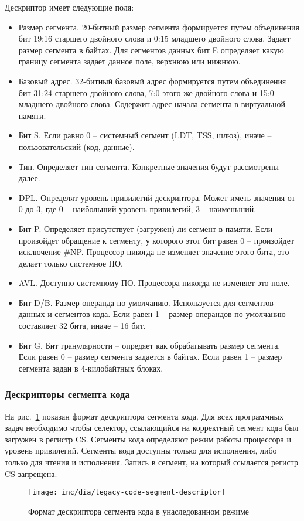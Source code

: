 Дескриптор имеет следующие поля:
\begin{itemize}
\item Размер сегмента. 20-битный размер сегмента формируется путем объединения
	бит 19:16 старшего двойного слова и 0:15 младшего двойного слова. Задает размер сегмента
	в байтах. Для сегментов данных бит E определяет какую границу сегмента задает данное поле,
	верхнюю или нижнюю.
\item Базовый адрес. 32-битный базовый адрес формируется путем объединения бит 31:24 старшего двойного слова,
	7:0 этого же двойного слова и 15:0 младшего двойного слова. Содержит адрес начала сегмента в
	виртуальной памяти.
\item Бит S. Если равно 0 -- системный сегмент (LDT, TSS, шлюз), иначе -- пользовательский (код, данные).
\item Тип. Определяет тип сегмента. Конкретные значения будут рассмотрены далее.
\item DPL. Определят уровень привилегий дескриптора. Может иметь значения от 0 до 3, где 0 -- наибольший
	уровень привилегий, 3 -- наименьший.
\item Бит P. Определяет присутствует (загружен) ли сегмент в памяти. Если произойдет обращение к сегменту,
	у которого этот бит равен 0 -- произойдет исключение \#NP. Процессор никогда не изменяет значение
	этого бита, это делает только системное ПО.
\item AVL. Доступно системному ПО. Процессора никогда не изменяет это поле.
\item Бит D/B. Размер операнда по умолчанию. Используется для сегментов данных и сегментов кода.
	Если равен 1 -- размер операндов по умолчанию составляет 32 бита, иначе -- 16 бит.
\item Бит G. Бит гранулярности -- опредяет как обрабатывать размер сегмента. Если равен 0 -- размер сегмента
	задается в байтах. Если равен 1 -- размер сегмента задан в 4-килобайтных блоках.
\end{itemize}

\subsubsection*{Дескрипторы сегмента кода}
На рис.~\ref{fig:legacy-code-segment-descriptor-format} показан формат дескриптора сегмента кода. Для
всех программных задач необходимо чтобы селектор, ссылающийся на корректный сегмент кода был загружен в регистр CS.
Сегменты кода определяют режим работы процессора и уровень привилегий. Сегменты кода доступны только для исполнения,
либо только для чтения и исполнения. Запись в сегмент, на который ссылается регистр CS запрещена.
\begin{figure}[ht]
  \centering
  \texttt{[image: inc/dia/legacy-code-segment-descriptor]}
  \caption{Формат дескриптора сегмента кода в унаследованном режиме}
  \label{fig:legacy-code-segment-descriptor-format}
\end{figure}

